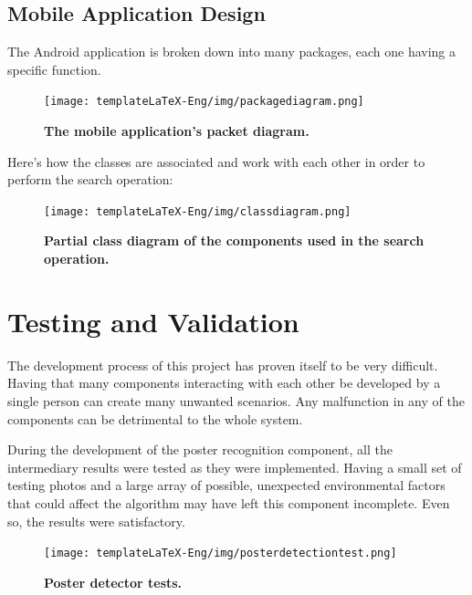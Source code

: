 \documentclass[12pt,a4paper,twoside]{report}
\begin{document}

\section{Mobile Application Design}
The Android application is broken down into many packages, each one having a specific function.
 \begin{figure}[H]
    \begin{center}
        \texttt{[image: templateLaTeX-Eng/img/packagediagram.png]}
        \caption{\bf The mobile application's packet diagram.}
    \end{center}
\end{figure}
\pagebreak

Here's how the classes are associated and work with each other in order to perform the search operation:
 \begin{figure}[H]
    \begin{center}
        \texttt{[image: templateLaTeX-Eng/img/classdiagram.png]}
        \caption{\bf Partial class diagram of the components used in the search operation.}
    \end{center}
\end{figure}
\pagebreak

\chapter{Testing and Validation}
The development process of this project has proven itself to be very difficult. Having that many components interacting with each other be developed by a single person can create many unwanted scenarios. Any malfunction in any of the components can be detrimental to the whole system.

During the development of the poster recognition component, all the intermediary results were tested as they were implemented. Having a small set of testing photos and a large array of possible, unexpected environmental factors that could affect the algorithm may have left this component incomplete. Even so, the results were satisfactory.
 \begin{figure}[H]
    \begin{center}
        \texttt{[image: templateLaTeX-Eng/img/posterdetectiontest.png]}
        \caption{\bf Poster detector tests.}
    \end{center}
\end{figure}
\end{document}
